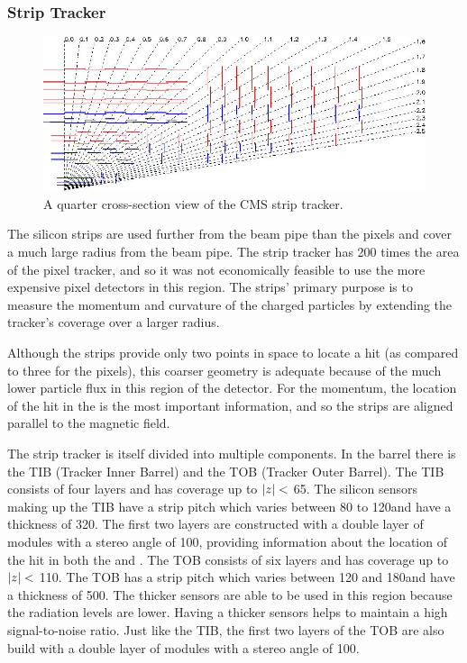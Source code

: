 \subsubsection{Strip Tracker}

\begin{figure}[tb]
    \centering
    \includegraphics[width=\textwidth]{figures/strip_layout.jpg}
    \caption{A quarter cross-section view of the CMS strip tracker.}
    \label{fig:strip_layout}
\end{figure}

The silicon strips are used further from the beam pipe than the pixels and
cover a much large radius from the beam pipe. The strip tracker has 200 times
the area of the pixel tracker, and so it was not economically feasible to use
the more expensive pixel detectors in this region. The strips' primary purpose
is to measure the momentum and curvature of the charged particles by extending
the tracker's coverage over a larger radius.

Although the strips provide only two points in space to locate a hit (as
compared to three for the pixels), this coarser geometry is adequate because of
the much lower particle flux in this region of the detector. For the momentum,
the location of the hit in the \rphiplane is the most important information,
and so the strips are aligned parallel to the magnetic field. 

The strip tracker is itself divided into multiple components. In the barrel
there is the TIB (Tracker Inner Barrel) and the TOB (Tracker Outer Barrel). The
TIB consists of four layers and has coverage up to $|z|<$ 65\centimeters.
The silicon sensors making up the TIB have a strip pitch which varies between
80 to 120\micrometers and have a thickness of 320\micrometers. The first two
layers are constructed with a double layer of modules with a stereo angle of
100\millirads, providing information about the location of the hit in both the
\coordrphi and \rzplane. The TOB consists of six layers and has coverage up to
$|z|<$ 110\centimeters. The TOB has a strip pitch which varies between
120 and 180\micrometers and have a thickness of 500\micrometers. The thicker
sensors are able to be used in this region because the radiation levels are
lower. Having a thicker sensors helps to maintain a high signal-to-noise ratio.
Just like the TIB, the first two layers of the TOB are also build with a double
layer of modules with a stereo angle of 100\millirads.

